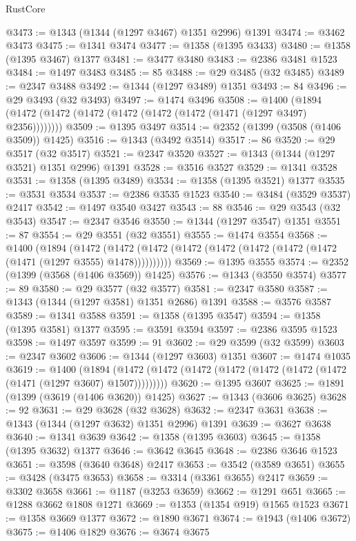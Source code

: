 \begin{lexlean}{RustCore}
\begin{coremodule}
@3473 := @1343 (@1344 (@1297 @3467) @1351 @2996) @1391
@3474 := @3462 @3473
@3475 := @1341 @3474
@3477 := @1358 (@1395 @3433)
@3480 := @1358 (@1395 @3467) @1377
@3481 := @3477 @3480
@3483 := @2386 @3481 @1523
@3484 := @1497 @3483
@3485 := 85
@3488 := @29 @3485 (@32 @3485)
@3489 := @2347 @3488
@3492 := @1344 (@1297 @3489) @1351
@3493 := 84
@3496 := @29 @3493 (@32 @3493)
@3497 := @1474 @3496
@3508 := @1400 (@1894 (@1472 (@1472 (@1472 (@1472 (@1472 (@1472 (@1471 (@1297 @3497) @2356))))))))
@3509 := @1395 @3497
@3514 := @2352 (@1399 (@3508 (@1406 @3509)) @1425)
@3516 := @1343 (@3492 @3514)
@3517 := 86
@3520 := @29 @3517 (@32 @3517)
@3521 := @2347 @3520
@3527 := @1343 (@1344 (@1297 @3521) @1351 @2996) @1391
@3528 := @3516 @3527
@3529 := @1341 @3528
@3531 := @1358 (@1395 @3489)
@3534 := @1358 (@1395 @3521) @1377
@3535 := @3531 @3534
@3537 := @2386 @3535 @1523
@3540 := @3484 (@3529 @3537) @2417
@3542 := @1497 @3540 @3427
@3543 := 88
@3546 := @29 @3543 (@32 @3543)
@3547 := @2347 @3546
@3550 := @1344 (@1297 @3547) @1351
@3551 := 87
@3554 := @29 @3551 (@32 @3551)
@3555 := @1474 @3554
@3568 := @1400
    (@1894
      (@1472 (@1472 (@1472 (@1472 (@1472 (@1472 (@1472 (@1472 (@1471 (@1297 @3555) @1478))))))))))
@3569 := @1395 @3555
@3574 := @2352 (@1399 (@3568 (@1406 @3569)) @1425)
@3576 := @1343 (@3550 @3574)
@3577 := 89
@3580 := @29 @3577 (@32 @3577)
@3581 := @2347 @3580
@3587 := @1343 (@1344 (@1297 @3581) @1351 @2686) @1391
@3588 := @3576 @3587
@3589 := @1341 @3588
@3591 := @1358 (@1395 @3547)
@3594 := @1358 (@1395 @3581) @1377
@3595 := @3591 @3594
@3597 := @2386 @3595 @1523
@3598 := @1497 @3597
@3599 := 91
@3602 := @29 @3599 (@32 @3599)
@3603 := @2347 @3602
@3606 := @1344 (@1297 @3603) @1351
@3607 := @1474 @1035
@3619 := @1400
    (@1894 (@1472 (@1472 (@1472 (@1472 (@1472 (@1472 (@1472 (@1471 (@1297 @3607) @1507)))))))))
@3620 := @1395 @3607
@3625 := @1891 (@1399 (@3619 (@1406 @3620)) @1425)
@3627 := @1343 (@3606 @3625)
@3628 := 92
@3631 := @29 @3628 (@32 @3628)
@3632 := @2347 @3631
@3638 := @1343 (@1344 (@1297 @3632) @1351 @2996) @1391
@3639 := @3627 @3638
@3640 := @1341 @3639
@3642 := @1358 (@1395 @3603)
@3645 := @1358 (@1395 @3632) @1377
@3646 := @3642 @3645
@3648 := @2386 @3646 @1523
@3651 := @3598 (@3640 @3648) @2417
@3653 := @3542 (@3589 @3651)
@3655 := @3428 (@3475 @3653)
@3658 := @3314 (@3361 @3655) @2417
@3659 := @3302 @3658
@3661 := @1187 (@3253 @3659)
@3662 := @1291 @651
@3665 := @1288 @3662 @1808 @1271
@3669 := @1353 (@1354 @919) @1565 @1523
@3671 := @1358 @3669 @1377
@3672 := @1890 @3671
@3674 := @1943 (@1406 @3672)
@3675 := @1406 @1829
@3676 := @3674 @3675

\end{coremodule}
\end{lexlean}
